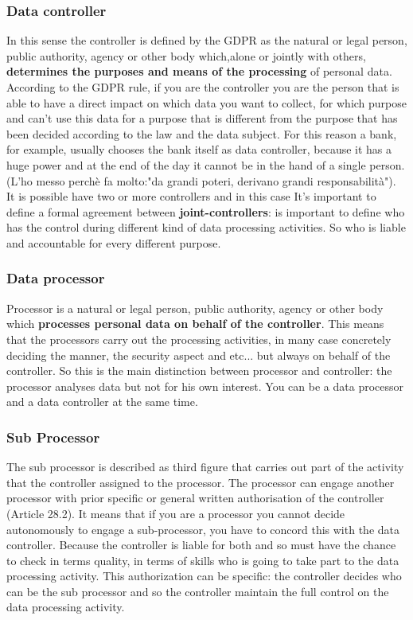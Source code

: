 \subsubsection{Data controller} 
In this sense the controller is defined by the GDPR as the natural or legal person, public authority, agency or other body which,alone or jointly with others, \textbf{determines the purposes and means of the processing} of personal data. According to the GDPR rule, if you are the controller you are the person that is able to have a direct impact on which data you want to collect, for which purpose and can't use this data for a purpose that is different from the purpose that has been decided according to the law and the data subject. For this reason a bank, for example, usually chooses the bank itself as data controller, because it has a huge power and at the end of the day it cannot be in the hand of a single person. (L'ho messo perchè fa molto:"da grandi poteri, derivano grandi responsabilità"). It is possible have two or more controllers and in this case It’s important to define a formal agreement between \textbf{joint-controllers}: is important to define who has the control during different kind of data processing activities. So who is liable and accountable for every different purpose.
\subsubsection{Data processor}
Processor is a natural or legal person, public authority, agency or other body which \textbf{processes personal data on behalf of the controller}. This means that the processors carry out the processing activities, in many case concretely deciding the manner, the security aspect and etc... but always on behalf of the controller. So this is the main distinction between processor and controller: the processor analyses data but not for his own interest. You can be a data processor and a data controller at the same time.
\subsubsection{Sub Processor}
The sub processor is described as third figure that carries out part of the activity that the controller assigned to the processor. The processor can engage another processor with prior specific or general written authorisation of the controller (Article 28.2). It means that if you are a processor you cannot decide autonomously to engage a sub-processor, you have to concord this with the data controller. Because the controller is liable for both and so must have the chance to check in terms quality, in terms of skills who is going to take part to the data processing activity. This authorization can be specific: the controller decides who can be the sub processor and so the controller maintain the full control on the data processing activity.
